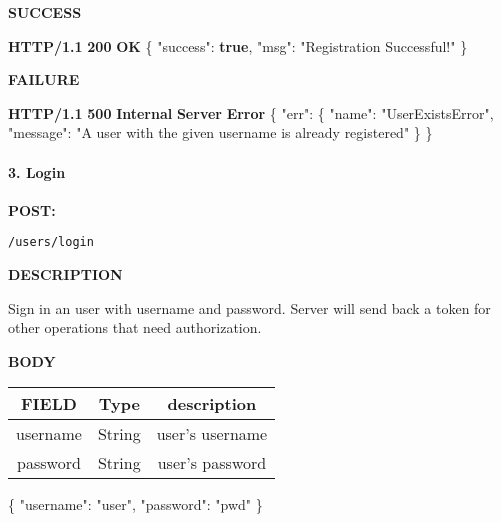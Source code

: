 \documentclass[
]{article}
\newenvironment{Shaded}{}{}
\newcommand{\DataTypeTok}[1]{\textcolor[rgb]{0.56,0.13,0.00}{#1}}
\newcommand{\ErrorTok}[1]{\textcolor[rgb]{1.00,0.00,0.00}{\textbf{#1}}}
\newcommand{\FunctionTok}[1]{\textcolor[rgb]{0.02,0.16,0.49}{#1}}
\newcommand{\KeywordTok}[1]{\textcolor[rgb]{0.00,0.44,0.13}{\textbf{#1}}}
\newcommand{\StringTok}[1]{\textcolor[rgb]{0.25,0.44,0.63}{#1}}
\begin{document}
\textbf{SUCCESS}

\begin{Shaded}
\begin{Highlighting}[]
\ErrorTok{HTTP/1.1} \ErrorTok{200} \ErrorTok{OK}
\FunctionTok{\{}
    \DataTypeTok{"success"}\FunctionTok{:} \KeywordTok{true}\FunctionTok{,}
    \DataTypeTok{"msg"}\FunctionTok{:} \StringTok{"Registration Successful!"}
\FunctionTok{\}}
\end{Highlighting}
\end{Shaded}

\textbf{FAILURE}

\begin{Shaded}
\begin{Highlighting}[]
\ErrorTok{HTTP/1.1} \ErrorTok{500} \ErrorTok{Internal} \ErrorTok{Server} \ErrorTok{Error}
\FunctionTok{\{}
    \DataTypeTok{"err"}\FunctionTok{:} \FunctionTok{\{}
        \DataTypeTok{"name"}\FunctionTok{:} \StringTok{"UserExistsError"}\FunctionTok{,}
        \DataTypeTok{"message"}\FunctionTok{:} \StringTok{"A user with the given username is already registered"}
    \FunctionTok{\}}
\FunctionTok{\}}
\end{Highlighting}
\end{Shaded}

\hypertarget{header-n97}{%
\paragraph{3. Login}\label{header-n97}}

\textbf{POST:}

\begin{verbatim}
/users/login
\end{verbatim}

\textbf{DESCRIPTION}

Sign in an user with username and password. Server will send back a
token for other operations that need authorization.

\textbf{BODY}

\begin{longtable}[]{@{}ccc@{}}
\toprule
FIELD & Type & description\tabularnewline
\midrule
\endhead
username & String & user's username\tabularnewline
password & String & user's password\tabularnewline
\bottomrule
\end{longtable}

\begin{Shaded}
\begin{Highlighting}[]
\FunctionTok{\{}
    \DataTypeTok{"username"}\FunctionTok{:} \StringTok{"user"}\FunctionTok{,}
    \DataTypeTok{"password"}\FunctionTok{:} \StringTok{"pwd"}
\FunctionTok{\}}
\end{Highlighting}
\end{Shaded}
\end{document}
